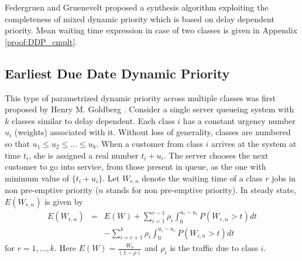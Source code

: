 \documentclass[letterpaper, 10 pt, conference]{ieeeconf}  %
\begin{document}
Federgruen and Gruenevelt \cite{federgruen} proposed a synthesis algorithm exploiting the completeness of mixed dynamic priority which is based on delay dependent priority. Mean waiting time expression in case of two classes is given in Appendix \ref{proof:DDP_cmplt}.


\subsection{Earliest Due Date Dynamic Priority}  
  This type of parametrized dynamic priority across multiple classes was first proposed by Henry M. Goldberg \cite{EDDpriority}. Consider a single server queueing system with $k$ classes similar to delay dependent. Each class $i$ has a constant urgency number $u_i$ (weights) associated with it. Without loss of generality, classes are numbered so that $u_1 \leq u_2 \leq \dots \leq u_k$. When a customer from class $i$ arrives at the system at time $t_i$, she is assigned a real number $t_i + u_i$. The server chooses the next customer to go into service, from those present in queue, as the one with minimum value of $\{t_i + u_i\}$. 
Let $W_{r,n}$ denote the waiting time of a class $r$ jobs in non pre-emptive priority ($n$ stands for non pre-emptive priority). In steady state, $E(W_{r,n})$ is given by \cite{EDDpriority}
  \begin{eqnarray}\nonumber
  E(W_{r,n}) &=& E(W) + \sum_{i=1}^{r-1}\rho_i\int_{0}^{u_r-u_i}P(W_{r,n} > t)dt \\\label{eqn:EDD_recursion}
 & & - \sum_{i=r+1}^{k}\rho_i\int_{0}^{u_i-u_r}P(W_{i,n} > t)dt 
  \end{eqnarray}
for $r = 1, \dots, k$. Here $E(W) = \frac{W_0}{(1-\rho)}$ and $\rho_i$ is the traffic due to class $i$.
\end{document}
